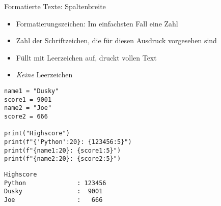 \begin{frame}[fragile]{Formatierte Texte: Spaltenbreite}
%
\begin{itemize}
\item Formatierungszeichen: Im einfachsten Fall eine Zahl
\item Zahl der Schriftzeichen, die für diesen Ausdruck vorgesehen sind
\item Füllt mit Leerzeichen auf, druckt vollen Text
\item \emph{Keine} Leerzeichen
\end{itemize}
%
\vspace{-10pt}
\begin{minipage}[t]{.49\linewidth}
\phantom{x}
\begin{codebox}
\begin{verbatim}
name1 = "Dusky"
score1 = 9001
name2 = "Joe"
score2 = 666

print("Highscore")
print(f"{'Python':20}: {123456:5}")
print(f"{name1:20}: {score1:5}")
print(f"{name2:20}: {score2:5}")
\end{verbatim}
\end{codebox}
\end{minipage}
%
\begin{minipage}[t]{.49\linewidth}
\phantom{x}
\begin{cmdbox}
\begin{verbatim}
Highscore
Python              : 123456
Dusky               :  9001
Joe                 :   666
\end{verbatim}
\end{cmdbox}
\end{minipage}
%
\end{frame}


